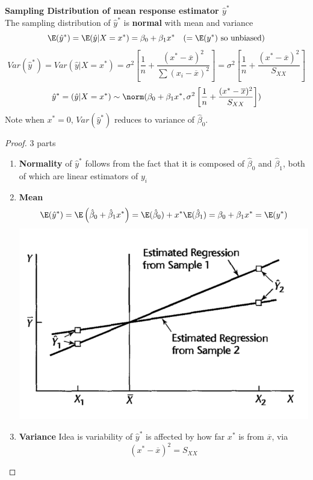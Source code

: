 \documentclass[11pt]{article}
\begin{document}
\begin{defn*}
    \textbf{Sampling Distribution of mean response estimator $\hat{y}^*$} \\
    The sampling distribution of $\hat{y}^*$ is \textbf{normal} with mean and variance 
    \[
        \E(\hat{y}^*) = \E(\hat{y}|X=x^*) = \beta_0 + \beta_1 x^* \quad \text{($= \E(y^*)$ so unbiased)}
    \]
    \[
        Var(\hat{y}^*) = Var(\hat{y}|X=x^*) = \sigma^2 \left[ \frac{1}{n} + \frac{(x^* - \overline{x})^2}{\sum (x_i - \overline{x})^2} \right] = \sigma^2 \left[ \frac{1}{n} + \frac{(x^* - \overline{x})^2}{S_{XX}} \right]
    \]
    \[
        \hat{y}^* = (\hat{y}|X=x^*) \sim \norm(\beta_0 + \beta_1 x^*, \sigma^2 \left[ \frac{1}{n} + \frac{(x^* - \overline{x})^2}{S_{XX}} \right])
    \]
    Note when $x^*=0$, $Var(\hat{y}^*)$ reduces to variance of $\hat{\beta}_0$. 
    \begin{proof}
        3 parts
        \begin{enumerate}
            \item \textbf{Normality} of $\hat{y}^*$ follows from the fact that it is composed of $\hat{\beta}_0$ and $\hat{\beta}_1$, both of which are linear estimators of $y_i$
            \item \textbf{Mean}
            \[
                \E(\hat{y}^*)=  \E\left( \hat{\beta}_0 + \hat{\beta}_1 x^* \right) = \E(\hat{\beta}_0) + x^* \E(\hat{\beta}_1) = \beta_0 + \beta_1 x^* = \E(y^*)
            \]
            \includegraphics[width=\textwidth/2]{mean_response_var_plot}
            \item \textbf{Variance} Idea is variability of $\hat{y}^*$ is affected by how far $x^*$ is from $\overline{x}$, via 
            \[
                (x^* - \overline{x})^2 = S_{XX}
\]
\end{enumerate}
\end{proof}
\end{defn*}
\end{document}
